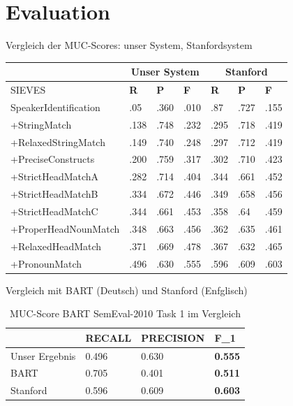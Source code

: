 \documentclass[11pt,a4paper]{beamer}
\begin{document}
\section{Evaluation}
\begin{frame}{Vergleich der MUC-Scores: unser System, Stanfordsystem}
\begin{table}[h]
\begin{tabular}{l||lll || lll}

 & \multicolumn{3}{c||}{Unser System}& \multicolumn{3}{c}{Stanford} \\ \hline

                        SIEVES    & \textbf{R} & \textbf{P} & \textbf{F} 	& \textbf{R}   & \textbf{P} & \textbf{F} \\ \hline
SpeakerIdentification       & .05            & .360              & .010          	& .87    & .727      & .155  \\
+StringMatch      & .138           & .748              & .232          	& .295   & .718      & .419  \\
+RelaxedStringMatch         & .149           & .740              & .248         	& .297   & .712      & .419   \\
+PreciseConstructs & .200           & .759     & .317           	& .302   & .710      & .423  \\
+StrictHeadMatchA  & .282           & .714              & .404          	& .344   & .661      & .452  \\
+StrictHeadMatchB  & .334           & .672              & .446          	& .349   & .658      & .456   \\
+StrictHeadMatchC           & .344           & .661              & .453           	& .358   & .64       & .459 \\
+ProperHeadNounMatch        & .348           & .663     & .456            	& .362   & .635      & .461  \\
+RelaxedHeadMatch           & .371           & .669              & .478           	& .367   & .632      & .465   \\
+PronounMatch		    & .496           & .630              & .555 	& .596   & .609      & .603     
\end{tabular}
\end{table}
\end{frame}



\begin{frame}{Vergleich mit BART (Deutsch) und Stanford (Enfglisch)}
\begin{table}[h]
\begin{tabular}{l||lll}
             	& RECALL		 & PRECISION & F\_1    \\ \hline
Unser Ergebnis 	& 0.496      & 0.630              & \textbf{0.555}  \\
BART  & 0.705 		 & 0.401     & \textbf{0.511}    \\ 
Stanford & 0.596   & 0.609      & \textbf{0.603}
          
\end{tabular}
\caption{MUC-Score BART SemEval-2010 Task 1 im Vergleich} 
\end{table}
\end{frame}
\end{document}
